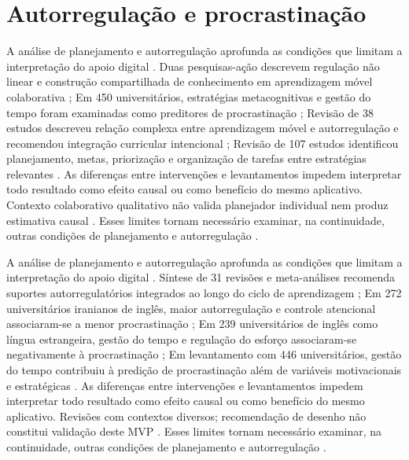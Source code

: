 \clearpage\section{Autorregulação e procrastinação}

A análise de planejamento e autorregulação aprofunda as condições que limitam a interpretação do apoio digital \citep{education_lim2019} \citep{education_limone2020} \citep[p. 156, 164–165]{education_palalas2020} \citep{education_patzak2025}. Duas pesquisas-ação descrevem regulação não linear e construção compartilhada de conhecimento em aprendizagem móvel colaborativa \citep{education_lim2019}; Em 450 universitários, estratégias metacognitivas e gestão do tempo foram examinadas como preditores de procrastinação \citep{education_limone2020}; Revisão de 38 estudos descreveu relação complexa entre aprendizagem móvel e autorregulação e recomendou integração curricular intencional \citep[p. 156, 164–165]{education_palalas2020}; Revisão de 107 estudos identificou planejamento, metas, priorização e organização de tarefas entre estratégias relevantes \citep{education_patzak2025}. As diferenças entre intervenções e levantamentos impedem interpretar todo resultado como efeito causal ou como benefício do mesmo aplicativo. Contexto colaborativo qualitativo não valida planejador individual nem produz estimativa causal \citep{education_lim2019} \citep{education_limone2020} \citep[p. 156, 164–165]{education_palalas2020} \citep{education_patzak2025}. Esses limites tornam necessário examinar, na continuidade, outras condições de planejamento e autorregulação \citep{education_lim2019} \citep{education_limone2020} \citep[p. 156, 164–165]{education_palalas2020} \citep{education_patzak2025}.

A análise de planejamento e autorregulação aprofunda as condições que limitam a interpretação do apoio digital \citep[p. 1809, 1825–1827]{education_prasse2024} \citep{education_taghavi2024} \citep{education_tao2025} \citep{education_wolters2017}. Síntese de 31 revisões e meta-análises recomenda suportes autorregulatórios integrados ao longo do ciclo de aprendizagem \citep[p. 1809, 1825–1827]{education_prasse2024}; Em 272 universitários iranianos de inglês, maior autorregulação e controle atencional associaram-se a menor procrastinação \citep{education_taghavi2024}; Em 239 universitários de inglês como língua estrangeira, gestão do tempo e regulação do esforço associaram-se negativamente à procrastinação \citep{education_tao2025}; Em levantamento com 446 universitários, gestão do tempo contribuiu à predição de procrastinação além de variáveis motivacionais e estratégicas \citep{education_wolters2017}. As diferenças entre intervenções e levantamentos impedem interpretar todo resultado como efeito causal ou como benefício do mesmo aplicativo. Revisões com contextos diversos; recomendação de desenho não constitui validação deste MVP \citep[p. 1809, 1825–1827]{education_prasse2024} \citep{education_taghavi2024} \citep{education_tao2025} \citep{education_wolters2017}. Esses limites tornam necessário examinar, na continuidade, outras condições de planejamento e autorregulação \citep[p. 1809, 1825–1827]{education_prasse2024} \citep{education_taghavi2024} \citep{education_tao2025} \citep{education_wolters2017}.


